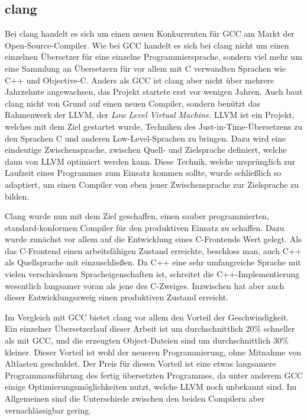 \subsection{clang}
Bei clang handelt es sich um einen neuen Konkurrenten für GCC am Markt der Open-Source-Compiler. Wie bei GCC handelt es sich bei clang nicht um einen einzelnen Übersetzer für eine einzelne Programmiersprache,
sondern viel mehr um eine Sammlung an Übersetzern für vor allem mit C verwandten Sprachen wie C++ und Objective-C. Anders als GCC ist clang aber nicht über mehrere Jahrzehnte angewachsen, das Projekt
startete erst vor wenigen Jahren. Auch baut clang nicht von Grund auf einen neuen Compiler, sondern benützt das Rahmenwerk der LLVM, der \textit{Low Level Virtual Machine}. LLVM ist ein Projekt, welches
mit dem Ziel gestartet wurde, Techniken des Just-in-Time-Übersetzens zu den Sprachen C und anderen Low-Level-Sprachen zu bringen. Dazu wird eine eindeutige Zwischensprache, zwischen Quell- und Zielsprache
definiert, welche dann von LLVM optimiert werden kann. Diese Technik, welche ursprünglich zur Laufzeit eines Programmes zum Einsatz kommen sollte, wurde schließlich so adaptiert, um einen Compiler von
eben jener Zwischensprache zur Zielsprache zu bilden. 

Clang wurde nun mit dem Ziel geschaffen, einen sauber programmierten, standard-konformen Compiler für den produktiven Einsatz zu schaffen. Dazu wurde zunächst vor allem auf die Entwicklung eines C-Frontends
Wert gelegt. Als das C-Frontend einen arbeitsfähigen Zustand erreichte, beschloss man, auch C++ als Quellsprache mit einzuschließen. Da C++ eine sehr umfangreiche Sprache mit vielen verschiedenen Spracheigenschaften 
ist, schreitet die C++-Implementierung wesentlich langsamer voran als jene des C-Zweiges. Inzwischen hat aber auch dieser Entwicklungszweig einen produktiven Zustand erreicht. 

Im Vergleich mit GCC bietet clang vor allem den Vorteil der Geschwindigkeit. Ein einzelner Übersetzerlauf dieser Arbeit ist um durchschnittlich 20\% schneller als mit GCC, und die erzeugten Object-Dateien
sind um durchschnittlich 30\% kleiner. Dieser Vorteil ist wohl der neueren Programmierung, ohne Mitnahme von Altlasten geschuldet. Der Preis für diesen Vorteil ist eine etwas langsamere Programmausführung
des fertig übersetzten Programmes, da unter anderem GCC einige Optimierungsmöglichkeiten nutzt, welche LLVM noch unbekannt sind. Im Allgemeinen sind die Unterschiede zwischen den beiden Compilern aber
vernachlässigbar gering.

